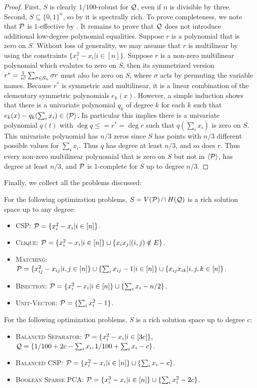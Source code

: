 \begin{proof}
First, $S$ is clearly $1/100$-robust for $\mathcal Q$, even if $n$ is divisible by three. Second, $S \subseteq \{0,1\}^n$, so by  it is spectrally rich. To prove completeness, we note that $\mathcal P$ is $1$-effective by . It remains to prove that $\mathcal Q$ does not introduce additional low-degree polynomial equalities. 
Suppose $r$ is a polynomial that is zero on $S$.  
Without loss of generality, we may assume that $r$ is multilinear by using the constraints $\{x_i^2 - x_i | i \in [n]\}$.
Suppose $r$ is a non-zero multilinear polynomial which evalutes to zero on $S$, then its symmetrized version $r^* = \frac{1}{n!}\sum_{\sigma \in \mathcal S_n} \sigma r$ must also be zero on $S$, where $\sigma$ acts by permuting the variable names. Because $r^*$ is symmetric and multilinear, it is a linear combination of the elementary symmetric polynomials $e_k(x)$. However, a simple induction shows that there is a univariate polynomial $q_k$ of degree $k$ for each $k$ such that $e_k(x) - q_k(\sum_i x_i) \in \langle \mathcal P \rangle$. In particular this implies there is a univariate polynomial $q(t)$ with $\deg q \leq = r^* = \deg r$ such that $q(\sum_i x_i)$ is zero on $S$.
This univariate polynomial has $n/3$ zeros since $S$ has points with $n/3$ different possible values for $\sum_i x_i$. Thus $q$ has degree at least $n/3$, and so does $r$. Thus every non-zero multilinear polynomial that is zero on $S$ but not in $\langle \mathcal P\rangle$, has degree at least $n/3$, and $\mathcal P$ is $1$-complete for $S$ up to degree $n/3$.
\end{proof}
Finally, we collect all the problems discussed:
\begin{corollary}\label{cor:examples}
For the following optimization problems, $S = V(\mathcal P) \cap H(\mathcal Q)$ is a rich solution space up to any degree:
\begin{itemize}
\item \textsc{CSP}: $\mathcal P = \{x_i^2 - x_i | i \in [n]\}$. 
\item \textsc{Clique}: $\mathcal P = \{x_i^2 - x_i | i \in [n]\} \cup \{x_ix_j | (i,j) \notin E\}$.
\item \textsc{Matching}: $\mathcal P = \{x_{ij}^2 - x_{ij} | i,j \in [n]\} \cup \{\sum_i x_{ij} - 1 | i \in [n]\} \cup \{x_{ij}x_{ik} | i,j,k \in [n]\}$.
\item \textsc{Bisection}: $\mathcal P = \{x_i^2 - x_i | i \in [n]\} \cup \{\sum_i x_i - n/2\}$.
\item \textsc{Unit-Vector}: $\mathcal P = \{\sum_i x_i^2 - 1\}$.
\end{itemize}
For the following optimization problems, $S$ is a rich solution space up to degree $c$:
\begin{itemize}
\item \textsc{Balanced Separator}: $\mathcal P = \{x_i^2 - x_i | i \in [3c]\}$, $\mathcal Q = \{1/100 + 2c - \sum_i x_i, 1/100 + \sum_i x_i - c\}$.
\item \textsc{Balanced CSP}: $\mathcal P = \{x_i^2 - x_i | i \in [n]\} \cup \{\sum_i x_i - c\}$.
\item \textsc{Boolean Sparse PCA}: $\mathcal P = \{x_i^3-x_i | i \in [n]\} \cup \{\sum_i x_i^2 - 2c\}$.
\end{itemize}
\end{corollary}
